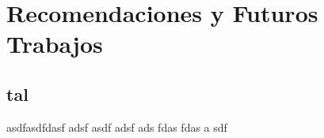 \chapter{Recomendaciones y Futuros Trabajos}

\section{tal}
asdfasdfdasf
adsf
asdf
adsf
ads
fdas
fdas
a
sdf